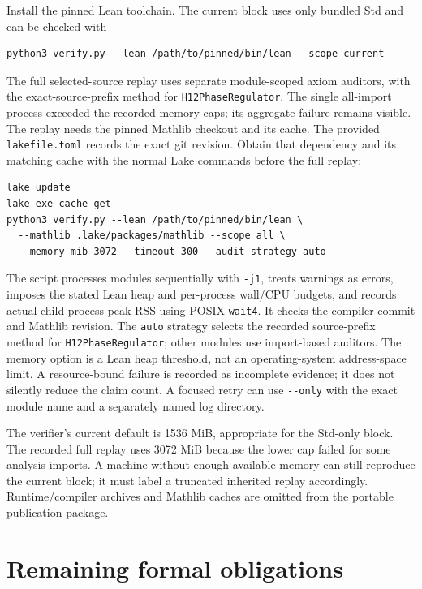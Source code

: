 \documentclass[11pt]{article}
\newcommand{\decl}[1]{\nolinkurl{#1}}
\begin{document}
Install the pinned Lean toolchain. The current block uses only bundled Std and can be checked with
\begin{verbatim}
python3 verify.py --lean /path/to/pinned/bin/lean --scope current
\end{verbatim}
The full selected-source replay uses separate module-scoped axiom auditors, with the exact-source-prefix method for \decl{H12PhaseRegulator}. The single all-import process exceeded the recorded memory caps; its aggregate failure remains visible. The replay needs the pinned Mathlib checkout and its cache. The provided \decl{lakefile.toml} records the exact git revision. Obtain that dependency and its matching cache with the normal Lake commands before the full replay:
\begin{verbatim}
lake update
lake exe cache get
python3 verify.py --lean /path/to/pinned/bin/lean \
  --mathlib .lake/packages/mathlib --scope all \
  --memory-mib 3072 --timeout 300 --audit-strategy auto
\end{verbatim}
The script processes modules sequentially with \decl{-j1}, treats warnings as errors, imposes the stated Lean heap and per-process wall/CPU budgets, and records actual child-process peak RSS using POSIX \decl{wait4}. It checks the compiler commit and Mathlib revision. The \decl{auto} strategy selects the recorded source-prefix method for \decl{H12PhaseRegulator}; other modules use import-based auditors. The memory option is a Lean heap threshold, not an operating-system address-space limit. A resource-bound failure is recorded as incomplete evidence; it does not silently reduce the claim count. A focused retry can use \decl{--only} with the exact module name and a separately named log directory.

The verifier's current default is 1536 MiB, appropriate for the Std-only block. The recorded full replay uses 3072 MiB because the lower cap failed for some analysis imports. A machine without enough available memory can still reproduce the current block; it must label a truncated inherited replay accordingly. Runtime/compiler archives and Mathlib caches are omitted from the portable publication package.

\section{Remaining formal obligations}
\end{document}

